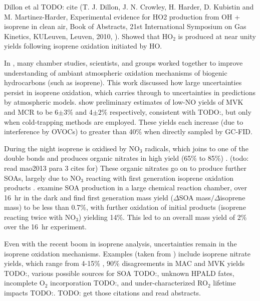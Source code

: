       Dillon et al TODO: cite (T. J. Dillon, J. N. Crowley, H. Harder, D. Kubistin and M. Martinez-Harder, Experimental evidence for HO2 production from OH + isoprene in clean air, Book of Abstracts, 21st International Symposium on Gas Kinetics, KULeuven, Leuven, 2010, ).
      Showed that HO$_2$ is produced at near unity yields following isoprene oxidation initiated by HO.
      
      In \cite{Nguyen2014}, many chamber studies, scientists, and groups worked together to improve understanding of ambiant atmospheric oxidation mechanisms of biogenic hydrocarbons (such as isoprene). 
      This work discussed how large uncertainties persist in isoprene oxidation, which carries through to uncertainties in predictions by atmospheric models.
      \citet{Nguyen2014} show preliminary estimates of low-NO yields of MVK and MCR to be 6$\pm3\%$ and 4$\pm2\%$ respectively, consistent with TODO:\citet{Liu2013}, but only when cold-trapping methods are employed.
      These yields each increase (due to interference by OVOCs) to greater than 40\% when directly sampled by GC-FID.
      
      During the night isoprene is oxidised by NO$_3$ radicals, which joins to one of the double bonds and produces organic nitrates in high yield (65\% to 85\%) \citep{Mao2013}. (todo: read mao2013 para 3 cites for)
      These organic nitrates go on to produce further SOAs, largely due to NO$_3$ reacting with first generation isoprene oxidation products \citep{Rollins2009}.
      \cite{Rollins2009} examine SOA production in a large chemical reaction chamber, over 16~hr in the dark and find first generation mass yield ($\Delta$SOA mass$/\Delta$isoprene mass) to be less than 0.7\%, with further oxidation of initial products (isoprene reacting twice with NO$_3$) yielding 14\%.
      This led to an overall mass yield of 2\% over the 16~hr experiment.
      
      Even with the recent boom in isoprene analysis, uncertainties remain in the isoprene oxidation mechanisms.
	    Examples (taken from \citet{Nguyen2014}) include isoprene nitrate yields, which range from 4-15\% \citep{Paulot2009a}, 90\% disagreements in MAC and MVK yields TODO:\citep{Liu2013}, various possible sources for SOA TODO:\citep{Chan2010, Surratt2010, Lin2013}, unknown HPALD fates, incomplete O$_2$ incorporation TODO:\citep{Peeters2009,Crounse2013}, and under-characterized RO$_2$ lifetime impacts TODO:\citep{Wolfe2012}. TODO: get those citations and read abstracts.
      
